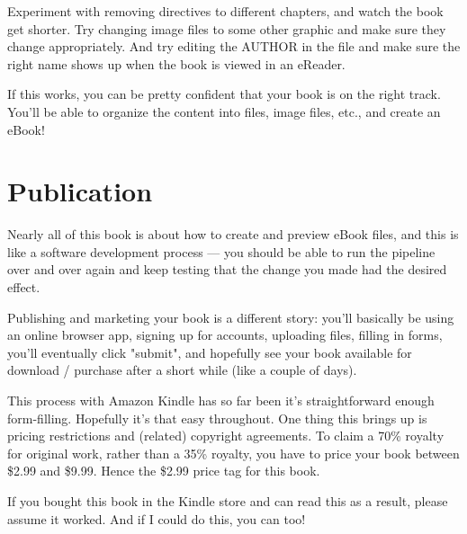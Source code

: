 Experiment with removing directives to  different chapters, and watch the book get shorter. Try changing image files to some other graphic
and make sure they change appropriately. And try editing the AUTHOR in the  file and make sure the right name shows up when the book is viewed in an eReader.

If this works, you can be pretty confident that your book is on the right track. You'll be able to organize the content into \tex files, image files, etc., and create an eBook!


\section{Publication}

Nearly all of this book is about how to create and preview eBook files, and this is like a software development process
--- you should be able to run the pipeline over and over again and keep testing that the change you made had the desired effect.

Publishing and marketing your book is a different story: you'll basically be using an online browser app, signing up for accounts, uploading files, filling in forms,
you'll eventually click "submit", and hopefully see your book available for download / purchase after a short while (like a couple of days).

This process with Amazon Kindle has so far been it's straightforward enough form-filling. Hopefully it's that easy throughout.
One thing this brings up is pricing restrictions and (related) copyright agreements. To claim a 70\% royalty for original work,
rather than a 35\% royalty, you have to price your book between \$2.99 and \$9.99. Hence the \$2.99 price tag for this book.

If you bought this book in the Kindle store and can read this as a result, please assume it worked. And if I could do this, you can too!





